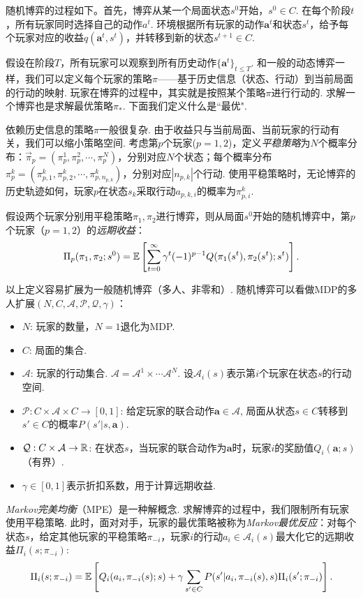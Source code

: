 随机博弈的过程如下。首先，博弈从某一个局面状态$s^0$开始，$s^0\in C$. 在每个阶段$t$，所有玩家同时选择自己的动作$a^t$. 环境根据所有玩家的动作$\boldsymbol a^t$和状态$s^t$，给予每个玩家对应的收益$q(\boldsymbol a^t, s^t)$，并转移到新的状态$s^{t+1}\in C$. 

假设在阶段$T$，所有玩家可以观察到所有历史动作$\{\boldsymbol a^t\}_{t\le T}$. 和一般的动态博弈一样，我们可以定义每个玩家的策略$\pi$——基于历史信息（状态、行动）到当前局面的行动的映射. 玩家在博弈的过程中，其实就是按照某个策略$\pi$进行行动的. 求解一个博弈也是求解最优策略$\pi_*$. 下面我们定义什么是``最优".

依赖历史信息的策略$\pi$一般很复杂. 由于收益只与当前局面、当前玩家的行动有关，我们可以缩小策略空间. 考虑第$p$个玩家($p=1,2$)，定义\emph{平稳策略}为$N$个概率分布：$\vec \pi_p=(\pi_p^1,\pi_p^2,\cdots,\pi_p^N)$，分别对应$N$个状态；每个概率分布$\pi_p^k=(\pi_{p,1}^k,\pi_{p,2}^k,\cdots,\pi_{p,n_{p,k}}^k)$，分别对应$|n_{p,k}|$个行动. 使用平稳策略时，无论博弈的历史轨迹如何，玩家$p$在状态$s_k$采取行动$a_{p,k,i}$的概率为$\pi_{p,i}^k$.

假设两个玩家分别用平稳策略$\pi_1,\pi_2$进行博弈，则从局面$s^0$开始的随机博弈中，第$p$个玩家（$p=1,2$）的\emph{远期收益}：
        \[\Pi_p(\pi_1,\pi_2; s^0) = \mathbb{E}\left[\sum_{t=0}^\infty \gamma^t(-1)^{p-1} Q(\pi_1(s^t),\pi_2(s^t); {s^t}) \right].\]

以上定义容易扩展为一般随机博弈（多人、非零和）. 随机博弈可以看做MDP的多人扩展$(N, C, \mathcal A, \mathcal P,\mathcal Q, \gamma)$：
\begin{itemize}
    \item $N$: 玩家的数量，$N=1$退化为MDP.
    \item $C$: 局面的集合.
    \item $\mathcal A$: 玩家的行动集合. $\mathcal A=\mathcal A^1\times \cdots\mathcal A^N$. 设$\mathcal A_i(s)$表示第$i$个玩家在状态$s$的行动空间.
    \item $\mathcal P: C\times \mathcal A\times C\to [0,1]$: 给定玩家的联合动作$\boldsymbol a\in\mathcal A$, 局面从状态$s\in C$转移到$s'\in C$的概率$P(s'|s,\boldsymbol a)$.
    \item $\mathcal Q: C\times \mathcal A\to \mathbb{R}$: 在状态$s$，当玩家的联合动作为$\boldsymbol a$时，玩家$i$的奖励值$Q_i(\boldsymbol a;s)$（有界）. 
    \item $\gamma\in[0,1]$表示折扣系数，用于计算远期收益.
\end{itemize}

\emph{Markov完美均衡}（MPE）是一种解概念. 求解博弈的过程中，我们限制所有玩家使用平稳策略. 此时，面对对手，玩家的最优策略被称为\emph{Markov最优反应}：对每个状态$s$，给定其他玩家的平稳策略$\pi_{-i}$，玩家$i$的行动$a_i\in \mathcal A_i(s)$最大化它的远期收益$\Pi_i(s;\pi_{-i})$:
    \[\Pi_i(s;\pi_{-i}) = \mathbb{E}\left[Q_i(a_i,\pi_{-i}(s);s) + \gamma\sum_{s'\in C} P(s'|a_i,\pi_{-i}(s),s)\Pi_i(s';\pi_{-i}) \right].\]

